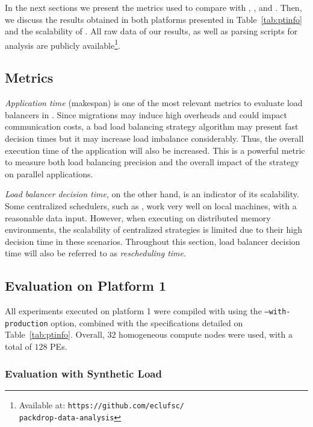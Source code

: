 In the next sections we present the metrics used to compare \packdrop with \greedylb, , \distributedlb and \dummylb.
Then, we discuss the results obtained in both platforms presented in Table~\ref{tab:ptinfo} and the scalability of \packdrop.
All raw data of our results, as well as parsing scripts for analysis are publicly available\footnote{Available at: \texttt{https://github.com/eclufsc/\\packdrop-data-analysis}}.

\subsection{Metrics}

\textit{Application time} (makespan) is one of the most relevant metrics to evaluate load balancers in \charm.
Since migrations may induce high overheads and could impact communication costs, a bad load balancing strategy algorithm may present fast decision times but it may increase load imbalance considerably. Thus, the overall execution time of the application will also be increased.
This is a powerful metric to measure both load balancing precision and the overall impact of the strategy on parallel applications.

\textit{Load balancer decision time}, on the other hand, is an indicator of its scalability.
Some centralized schedulers, such as \greedylb, work very well on local machines, with a reasonable data input.
However, when executing on distributed memory environments, the scalability of centralized strategies is limited due to their high decision time in these scenarios.
Throughout this section, load balancer decision time will also be referred to as \textit{rescheduling time}.

\subsection{Evaluation on Platform 1} \label{sec:cluster}

All experiments executed on platform 1 were compiled with \charm using the {\small\texttt{--with-production}} option, combined with the specifications detailed on Table~\ref{tab:ptinfo}.
Overall, $32$ homogeneous compute nodes were used, with a total of $128$ PEs.

\subsubsection{Evaluation with Synthetic Load} \label{sec:cluster:lbtest}

